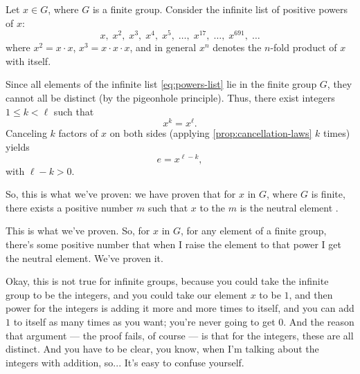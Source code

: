 \begin{content}
Let $x \in G$, where $G$ is a finite group. Consider the infinite list of positive powers of $x$:
\begin{equation}\label{eq:powers-list}
x, \; x^2, \; x^3, \; x^4, \; x^5, \; \dots, \; x^{17}, \; \dots, \; x^{691}, \; \dots
\end{equation}
where $x^2 = x \cdot x$, $x^3 = x \cdot x \cdot x$, and in general $x^n$ denotes the $n$-fold product of $x$ with itself.

Since all elements of the infinite list \eqref{eq:powers-list} lie in the finite group $G$, they cannot all be distinct (by the pigeonhole principle). Thus, there exist integers $1 \le k < \ell$ such that
\[
x^k = x^\ell.
\]
Canceling $k$ factors of $x$ on both sides (applying \cref{prop:cancellation-laws} $k$ times) yields
\[
e = x^{\ell - k},
\]
with $\ell - k > 0$.
\end{content}

\begin{speech}[01:20:22 - 01:21:56]
So, this is what we've proven: we have proven that for $x$ in $G$, where $G$ is finite, there exists a positive number $m$ such that $x$ to the $m$ is the neutral element .

This is what we've proven. So, for $x$ in $G$, for any element of a finite group, there's some positive number that when I raise the element to that power I get the neutral element. We've proven it.

Okay, this is not true for infinite groups, because you could take the infinite group to be the integers, and you could take our element $x$ to be $1$, and then power for the integers is adding it more and more times to itself, and you can add $1$ to itself as many times as you want; you're never going to get $0$. And the reason that argument --- the proof fails, of course --- is that for the integers, these  are all distinct. And you have to be clear, you know, when I'm talking about the integers with addition, so... It's easy to confuse yourself.
\end{speech}

